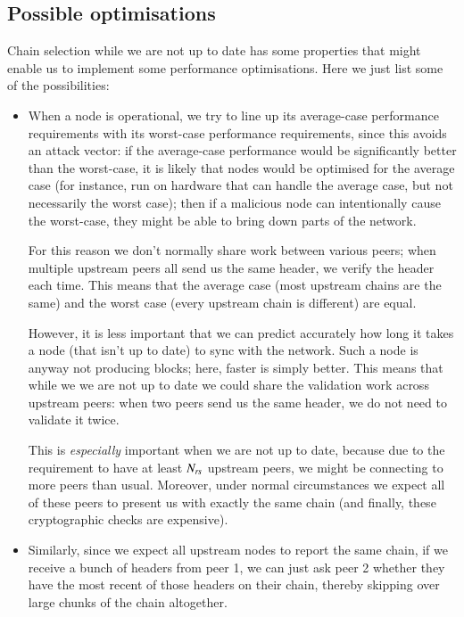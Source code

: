\subsection{Possible optimisations}
\label{genesis:optimisations}

Chain selection while we are not up to date has some properties that might
enable us to implement some performance optimisations. Here we just list some of
the possibilities:

\begin{itemize}

\item When a node is operational, we try to line up its average-case performance
requirements with its worst-case performance requirements, since this avoids
an attack vector: if the average-case performance would be significantly better
than the worst-case, it is likely that nodes would be optimised for the average
case (for instance, run on hardware that can handle the average case, but not
necessarily the worst case); then if a malicious node can intentionally cause
the worst-case, they might be able to bring down parts of the network.

For this reason we don't normally share work between various peers; when
multiple upstream peers all send us the same header, we verify the header
each time. This means that the average case (most upstream chains are the same)
and the worst case (every upstream chain is different) are equal.

However, it is less important that we can predict accurately how long it takes
a node (that isn't up to date) to sync with the network. Such a node is anyway
not producing blocks; here, faster is simply better. This means that while we
we are not up to date  we could share the validation work across upstream peers:
when two peers send us the same header, we do not need to validate it twice.

This is \emph{especially} important when we are not up to date, because due to
the requirement to have at least $N_\mathit{rs}$ upstream peers, we might be
connecting to more peers than usual. Moreover, under normal circumstances we
expect all of these peers to present us with exactly the same chain (and
finally, these cryptographic checks are expensive).

\item Similarly, since we expect all upstream nodes to report the same chain,
if we receive a bunch of headers from peer 1, we can just ask peer 2
whether they have the most recent of those headers on their chain, thereby
skipping over large chunks of the chain altogether.


\end{itemize}
